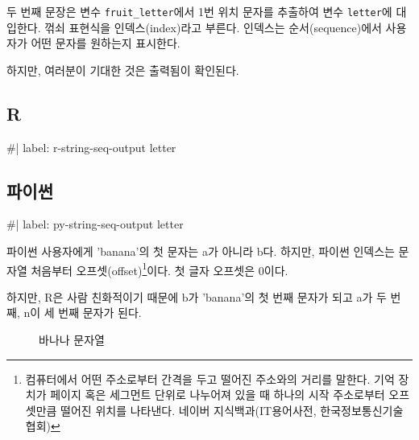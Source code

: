 \documentclass[
  letterpaper,
]{book}
\newenvironment{Shaded}{\begin{snugshade}}{\end{snugshade}}
\newcommand{\NormalTok}[1]{\textcolor[rgb]{0.00,0.23,0.31}{#1}}
\begin{document}
두 번째 문장은 변수 \texttt{fruit\_letter}에서 1번 위치 문자를 추출하여
변수 \texttt{letter}에 대입한다. 꺾쇠 표현식을 인덱스(index)라고 부른다.
인덱스는 순서(sequence)에서 사용자가 어떤 문자를 원하는지 표시한다.

하지만, 여러분이 기대한 것은 출력됨이 확인된다.

\subsection{R}

\begin{Shaded}
\begin{Highlighting}[]
\NormalTok{\#| label: r{-}string{-}seq{-}output}
\NormalTok{letter}
\end{Highlighting}
\end{Shaded}

\subsection{파이썬}

\begin{Shaded}
\begin{Highlighting}[]
\NormalTok{\#| label: py{-}string{-}seq{-}output}
\NormalTok{letter}
\end{Highlighting}
\end{Shaded}

파이썬 사용자에게 'banana'의 첫 문자는 a가 아니라 b다. 하지만, 파이썬
인덱스는 문자열 처음부터 오프셋(offset)\footnote{컴퓨터에서 어떤
  주소로부터 간격을 두고 떨어진 주소와의 거리를 말한다. 기억 장치가
  페이지 혹은 세그먼트 단위로 나누어져 있을 때 하나의 시작 주소로부터
  오프셋만큼 떨어진 위치를 나타낸다. 네이버 지식백과(IT용어사전,
  한국정보통신기술협회)}이다. 첫 글자 오프셋은 0이다.

하지만, R은 사람 친화적이기 때문에 b가 'banana'의 첫 번째 문자가 되고
a가 두 번째, n이 세 번째 문자가 된다. 

\begin{figure}


\caption{\label{fig-banana-string}바나나 문자열}

\end{figure}%
\end{document}
